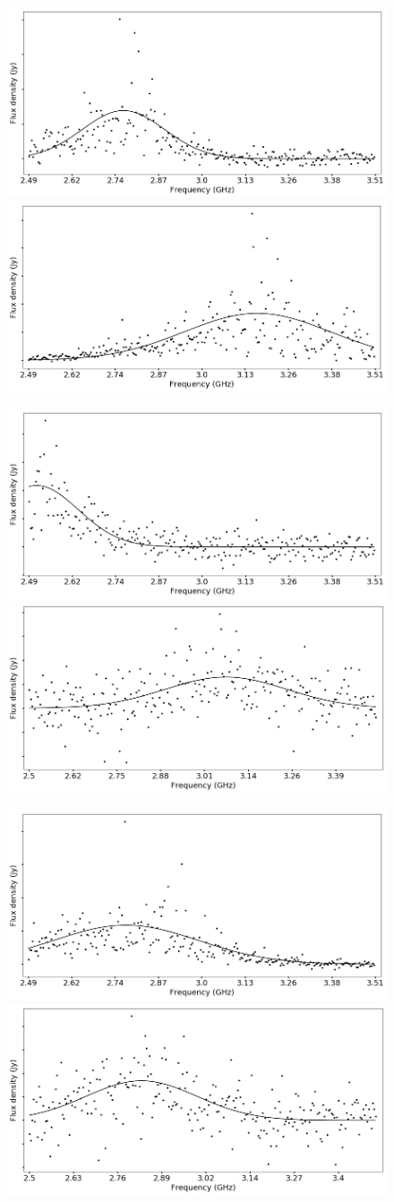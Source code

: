 \documentclass[twocolumn]{aastex61}
\begin{document}
\begin{figure}[ht]
\begin{center}
 \begin{minipage}{2\columnwidth}
  \includegraphics[width=0.5\columnwidth]{spec_57623.png}
  \includegraphics[width=0.5\columnwidth]{spec_57633_scan7.png}
 \end{minipage}

 \begin{minipage}{2\columnwidth}
  \includegraphics[width=0.5\columnwidth]{spec_57633_scan13.png}
  \includegraphics[width=0.5\columnwidth]{spec_57638.png}
 \end{minipage}

 \begin{minipage}{2\columnwidth}
  \includegraphics[width=0.5\columnwidth]{spec_57643.png}
  \includegraphics[width=0.5\columnwidth]{spec_57645.png}
 \end{minipage}


\end{center}
\end{figure}
\end{document}
